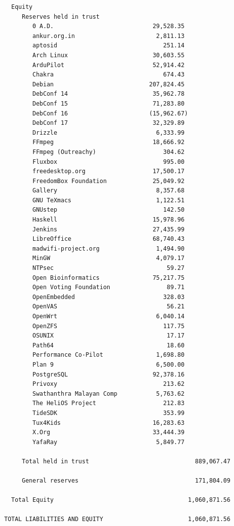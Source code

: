 \documentclass[letterpaper]{report}
\begin{document}
\begin{verbatim}
     Equity
        Reserves held in trust
           0 A.D.                            29,528.35
           ankur.org.in                       2,811.13
           aptosid                              251.14
           Arch Linux                        30,603.55
           ArduPilot                         52,914.42
           Chakra                               674.43
           Debian                           207,824.45
           DebConf 14                        35,962.78
           DebConf 15                        71,283.80
           DebConf 16                       (15,962.67)
           DebConf 17                        32,329.89
           Drizzle                            6,333.99
           FFmpeg                            18,666.92
           FFmpeg (Outreachy)                   304.62
           Fluxbox                              995.00
           freedesktop.org                   17,500.17
           FreedomBox Foundation             25,049.92
           Gallery                            8,357.68
           GNU TeXmacs                        1,122.51
           GNUstep                              142.50
           Haskell                           15,978.96
           Jenkins                           27,435.99
           LibreOffice                       68,740.43
           madwifi-project.org                1,494.90
           MinGW                              4,079.17
           NTPsec                                59.27
           Open Bioinformatics               75,217.75
           Open Voting Foundation                89.71
           OpenEmbedded                         328.03
           OpenVAS                               56.21
           OpenWrt                            6,040.14
           OpenZFS                              117.75
           OSUNIX                                17.17
           Path64                                18.60
           Performance Co-Pilot               1,698.80
           Plan 9                             6,500.00
           PostgreSQL                        92,378.16
           Privoxy                              213.62
           Swathanthra Malayan Comp           5,763.62
           The HeliOS Project                   212.83
           TideSDK                              353.99
           Tux4Kids                          16,283.63
           X.Org                             33,444.39
           YafaRay                            5,849.77

        Total held in trust                              889,067.47

        General reserves                                 171,804.09

     Total Equity                                      1,060,871.56

   TOTAL LIABILITIES AND EQUITY                        1,060,871.56
\end{verbatim}
\end{document}
